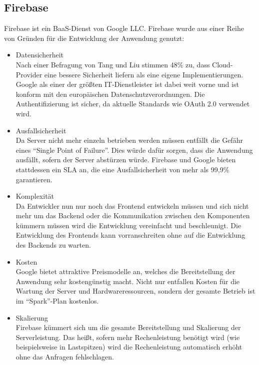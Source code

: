 \subsection{Firebase}
Firebase ist ein \ac{BaaS}-Dienst von Google LLC.
Firebase wurde aus einer Reihe von Gründen für die Entwicklung der Anwendung genutzt:
\begin{itemize}
    \item Datensicherheit\\
        Nach einer Befragung von Tang und Liu stimmen 48\% zu, dass Cloud-Provider eine bessere Sicherheit liefern als eine eigene Implementierungen.\autocite[S. 63]{TANG}
        Google als einer der größten IT-Dienstleister ist dabei weit vorne und ist konform mit den europäischen Datenschutzverordnungen.\autocite{firebaseDataprotection}
        Die Authentifizierung ist sicher, da aktuelle Standards wie OAuth 2.0 verwendet wird.
    \item Ausfallsicherheit\\
        Da Server nicht mehr einzeln betrieben werden müssen entfällt die Gefähr eines \enquote{Single Point of Failure}. %
        Dies würde dafür sorgen, dass die Anwendung ausfällt, sofern der Server abstürzen würde.
        Firebase und Google bieten stattdessen ein \ac{SLA} an, die eine Ausfallsicherheit von mehr als 99,9\% garantieren.\autocite{firebaseSLA}
    \item Komplexität\\
        Da Entwickler nun nur noch das Frontend entwickeln müssen und sich nicht mehr um das Backend oder die Kommunikation zwischen den Komponenten kümmern müssen wird die Entwicklung vereinfacht und beschleunigt.
        Die Entwicklung des Frontends kann vorranschreiten ohne auf die Entwicklung des Backends zu warten.
    \item Kosten \\
        Google bietet attraktive Preismodelle an, welches die Bereitstellung der Anwendung sehr kostengünstig macht.
        Nicht nur entfallen Kosten für die Wartung der Server und Hardwareressourcen, sondern der gesamte Betrieb ist im \enquote{Spark}-Plan kostenlos.
    \item Skalierung \\
        Firebase kümmert sich um die gesamte Bereitstellung und Skalierung der Serverleistung.
        Das heißt, sofern mehr Rechenleistung benötigt wird (wie beispielsweise in Lastspitzen) wird die Rechenleistung automatisch erhöht ohne das Anfragen fehlschlagen.
\end{itemize}








